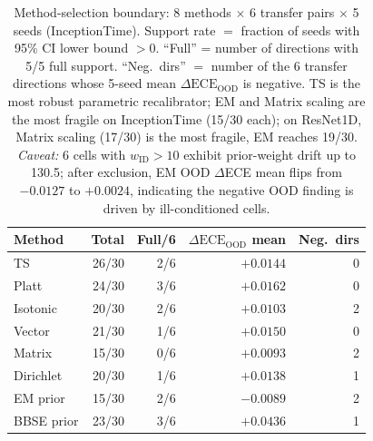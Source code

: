 \documentclass[review,12pt,nonatbib]{elsarticle}
\begin{document}
\begin{table}[t]
\centering
\caption{Method-selection boundary: 8 methods $\times$ 6 transfer pairs
$\times$ 5 seeds (InceptionTime). Support rate $=$ fraction of seeds
with 95\% CI lower bound $>0$. ``Full'' = number of directions with
5/5 full support. ``Neg.\ dirs'' $=$ number of the 6 transfer
directions whose 5-seed mean $\Delta\text{ECE}_{\text{OOD}}$ is
negative. TS is the most robust parametric recalibrator;
EM and Matrix scaling are the most fragile on InceptionTime
(15/30 each); on ResNet1D, Matrix scaling (17/30) is the most
fragile, EM reaches 19/30. \textit{Caveat:} 6 cells with
$w_{\text{ID}} > 10$ exhibit prior-weight drift up to 130.5; after
exclusion, EM OOD $\Delta$ECE mean flips from $-0.0127$ to $+0.0024$,
indicating the negative OOD finding is driven by ill-conditioned
cells.}
\label{tab:methods}
\footnotesize
\begin{tabular}{lrrrr}
\toprule
Method & Total & Full/6 & $\Delta\text{ECE}_{\text{OOD}}$ mean & Neg.\ dirs \\
\midrule
TS         & 26/30 & 2/6 & $+0.0144$ & 0 \\
Platt      & 24/30 & 3/6 & $+0.0162$ & 0 \\
Isotonic   & 20/30 & 2/6 & $+0.0103$ & 2 \\
Vector     & 21/30 & 1/6 & $+0.0150$ & 0 \\
Matrix     & 15/30 & 0/6 & $+0.0093$ & 2 \\
Dirichlet  & 20/30 & 1/6 & $+0.0138$ & 1 \\
EM prior   & 15/30 & 2/6 & $-0.0089$ & 2 \\
BBSE prior & 23/30 & 3/6 & $+0.0436$ & 1 \\
\bottomrule
\end{tabular}
\end{table}
\end{document}
